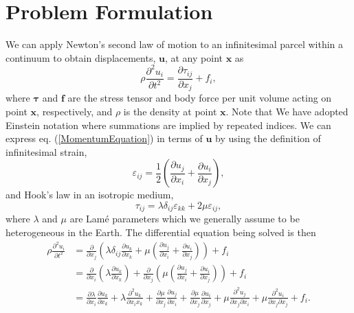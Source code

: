 \documentclass[12pt]{article}
\begin{document}
\section*{Problem Formulation}
We can apply Newton's second law of motion to an infinitesimal parcel
within a continuum to obtain displacements, $\boldsymbol{u}$,
at any point $\boldsymbol{x}$ as
\begin{equation}\label{MomentumEquation}
  \rho\frac{\partial^2 u_i}{\partial t^2}  = \frac{\partial \tau_{ij}}{\partial x_j} + f_i,
\end{equation}
where $\boldsymbol{\tau}$ and $\boldsymbol{f}$ are the stress tensor
and body force per unit volume acting on point $\boldsymbol{x}$,
respectively, and $\rho$ is the density at point
$\boldsymbol{x}$. Note that We have adopted Einstein notation where
summations are implied by repeated indices.  We can express
eq. (\ref{MomentumEquation}) in terms of $\boldsymbol{u}$ by using the
definition of infinitesimal strain,
\begin{equation}\label{Strain}
  \varepsilon_{ij} = \frac{1}{2}\left(\frac{\partial u_j}{\partial x_i} + 
                                \frac{\partial u_i}{\partial x_j}\right),
\end{equation}
and Hook's law in an isotropic medium,
\begin{equation}\label{HooksLaw}
  \tau_{ij} = \lambda\delta_{ij}\varepsilon_{kk} + 2\mu\varepsilon_{ij},
\end{equation}
where $\lambda$ and $\mu$ are Lam\'e parameters which we generally
assume to be heterogeneous in the Earth.  The differential equation
being solved is then
\begin{align}\label{DiffEq}
  \rho\frac{\partial^2 u_i}{\partial t^2} &= 
    \frac{\partial}{\partial x_j}\left(\lambda\delta_{ij}\frac{\partial u_k}{\partial x_k} +
    \mu\left(\frac{\partial u_j}{\partial x_i} + \frac{\partial
    u_i}{\partial x_j}\right)\right) + f_i\\\nonumber
  &= 
    \frac{\partial}{\partial x_i}\left(\lambda\frac{\partial u_k}{\partial x_k}\right) +
    \frac{\partial}{\partial x_j}\left(\mu\left(\frac{\partial u_j}{\partial x_i} + \frac{\partial
    u_i}{\partial x_j}\right)\right) + f_i\\\nonumber
  &= 
    \frac{\partial \lambda}{\partial x_i}
    \frac{\partial u_k}{\partial x_k} +
    \lambda\frac{\partial^2 u_k}{\partial x_i x_k} +
    \frac{\partial \mu}{\partial x_j}\frac{\partial u_j}{\partial x_i} +
    \frac{\partial \mu}{\partial x_j}\frac{\partial u_i}{\partial x_j} +
    \mu\frac{\partial^2 u_j}{\partial x_j \partial x_i} + 
    \mu\frac{\partial^2 u_i}{\partial x_j \partial x_j} + f_i.
\end{align}
\end{document}
